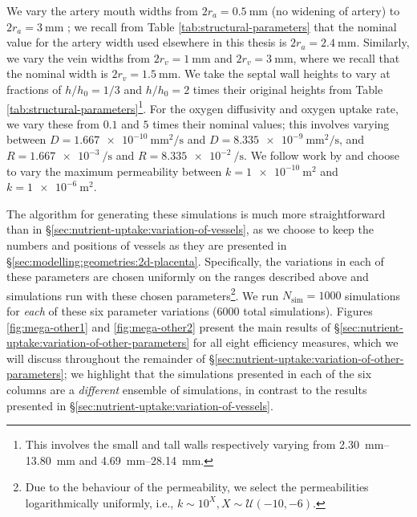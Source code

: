         We vary the artery mouth widths from $2r_a = \qty{0.5}{\milli\metre}$ (no widening of artery) to $2r_a = \qty{3}{\milli\metre}$ \cite{burtonRheologicalPhysiologicalConsequences2009}; we recall from Table \ref{tab:structural-parameters} that the nominal value for the artery width used elsewhere in this thesis is $2r_a = \qty{2.4}{\milli\metre}$. Similarly, we vary the vein widths from $2r_v = \qty{1}{\milli\metre}$ and $2r_v = \qty{3}{\milli\metre}$, where we recall that the nominal width is $2r_v = \qty{1.5}{\milli\metre}$. We take the septal wall heights to vary at fractions of $h/h_0 = 1/3$ and $h/h_0 = 2$ times their original heights from Table \ref{tab:structural-parameters}\footnote{This involves the small and tall walls respectively varying from \qtyrange{2.30}{13.80}{\milli\metre} and \qtyrange{4.69}{28.14}{\milli\metre}.}. For the oxygen diffusivity and oxygen uptake rate, we vary these from $0.1$ and $5$ times their nominal values; this involves varying between $D = \qty{1.667e-10}{\milli\metre^2\per\second}$ and $D = \qty{8.335e-9}{\milli\metre^2\per\second}$, and $R = \qty{1.667e-3}{\per\second}$ and $R = \qty{8.335e-2}{\per\second}$. We follow work by \citeauthor{lecarpentierComputationalFluidDynamic2016} \cite{lecarpentierComputationalFluidDynamic2016} and choose to vary the maximum permeability between $k = \qty{1e-10}{\metre^2}$ and $k = \qty{1e-6}{\metre^2}$.
        
        The algorithm for generating these simulations is much more straightforward than in \S\ref{sec:nutrient-uptake:variation-of-vessels}, as we choose to keep the numbers and positions of vessels as they are presented in \S\ref{sec:modelling:geometries:2d-placenta}. Specifically, the variations in each of these parameters are chosen uniformly on the ranges described above and simulations run with these chosen parameters\footnote{Due to the behaviour of the permeability, we select the permeabilities logarithmically uniformly, i.e., $k \sim 10^{X}, X \sim \mathcal{U}(-10, -6)$.}. We run $N_\text{sim} = 1000$ simulations for \textit{each} of these six parameter variations ($6000$ total simulations). Figures \ref{fig:mega-other1} and \ref{fig:mega-other2} present the main results of \S\ref{sec:nutrient-uptake:variation-of-other-parameters} for all eight efficiency measures, which we will discuss throughout the remainder of \S\ref{sec:nutrient-uptake:variation-of-other-parameters}; we highlight that the simulations presented in each of the six columns are a \textit{different} ensemble of simulations, in contrast to the results presented in \S\ref{sec:nutrient-uptake:variation-of-vessels}. 

